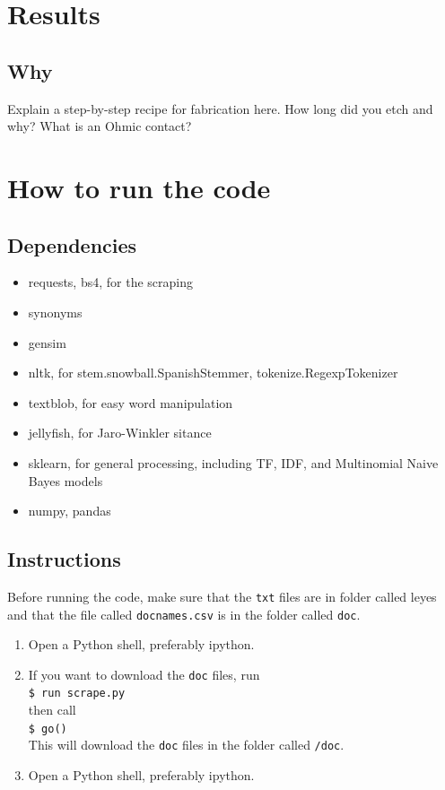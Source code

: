 \documentclass[letterpaper, margin=1in]{article}
\begin{document}
\section{Results}
\subsection{Why}
Explain a step-by-step recipe for fabrication here. How long did you etch and why? What is an Ohmic contact?

\newpage
\section{How to run the code}

\subsection{Dependencies}
\begin{itemize}
\item requests, bs4, for the scraping
\item synonyms
\item gensim 
\item nltk, for stem.snowball.SpanishStemmer, tokenize.RegexpTokenizer
\item textblob, for easy word manipulation
\item jellyfish, for Jaro-Winkler sitance
\item sklearn, for general processing, including TF, IDF, and Multinomial Naive Bayes models
\item numpy, pandas
\end{itemize}

\subsection{Instructions}
Before running the code, make sure that the \texttt{txt} files are in folder called leyes and that the file called \texttt{docnames.csv} is in the folder called \texttt{doc}.

\begin{enumerate}
\item Open a Python shell, preferably ipython.
\item If you want to download the \texttt{doc} files, run \\ \texttt{\$ run scrape.py} \\ then call \\ \texttt{\$ go()} \\ This will download the \texttt{doc} files in the folder called \texttt{/doc}.
\item Open a Python shell, preferably ipython.
\end{enumerate}
\end{document}
